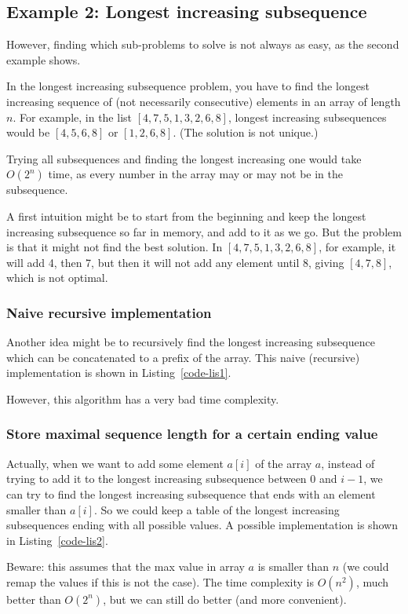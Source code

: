 \subsection{Example 2: Longest increasing subsequence}

However, finding which sub-problems to solve is not always as easy,
as the second example shows.

In the longest increasing subsequence problem, you have to find the longest
increasing sequence of (not necessarily consecutive) elements in an array of length $n$.
For example, in the list $[4,7,5,1,3,2,6,8]$, longest increasing subsequences
would be $[4,5,6,8]$ or $[1,2,6,8]$. (The solution is not unique.)

Trying all subsequences and finding the longest increasing one would
take $O(2^n)$ time, as every number in the array may or may not be in
the subsequence.


A first intuition might be to start from the beginning and keep the longest
increasing subsequence so far in memory, and add to it as we go.
But the problem is that it might not find the best solution.
In $[4,7,5,1,3,2,6,8]$, for example, it will add 4, then 7, but then
it will not add any element until 8, giving $[4,7,8]$, which is not optimal.

\subsubsection{Naive recursive implementation}
Another idea might be to recursively find the longest increasing subsequence which can be concatenated to a prefix of the array.
This naive (recursive) implementation is shown in Listing~\ref{code-lis1}.

However, this algorithm has a very bad time complexity.

\subsubsection{Store maximal sequence length for a certain ending value}
Actually, when we want to add some element $a[i]$ of the array $a$,
instead of trying to add it to the longest increasing subsequence
between $0$ and $i-1$, we can try to find the longest
increasing subsequence that ends with an element smaller than $a[i]$.
So we could keep a table of the longest increasing subsequences
ending with all possible values.
A possible implementation is shown in Listing~\ref{code-lis2}.

Beware: this assumes that the max value in array $a$ is smaller than $n$
(we could remap the values if this is not the case).
The time complexity is $O(n^2)$, much better than $O(2^n)$,
but we can still do better (and more convenient).

